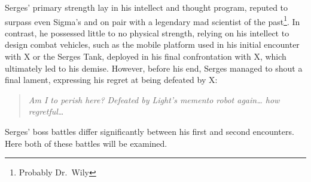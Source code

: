 Serges' primary strength lay in his intellect and thought program, reputed to surpass even Sigma's and on pair with a  legendary mad scientist of the past\footnote{Probably Dr.~Wily}. In contrast, he possessed little to no physical strength, relying on his intellect to design combat vehicles, such as the mobile platform used in his initial encounter with X or the Serges Tank, deployed in his final confrontation with X, which ultimately led to his demise. However, before his end, Serges managed to shout a final lament, expressing his regret at being defeated by X:
\begin{quote}
	\textit{Am I to perish here? Defeated by Light’s memento robot again… how regretful…}~\cite{wordpress:X2_japanese_script}
\end{quote}

Serges' boss battles differ significantly between his first and second encounters. Here both of these battles will be examined.

